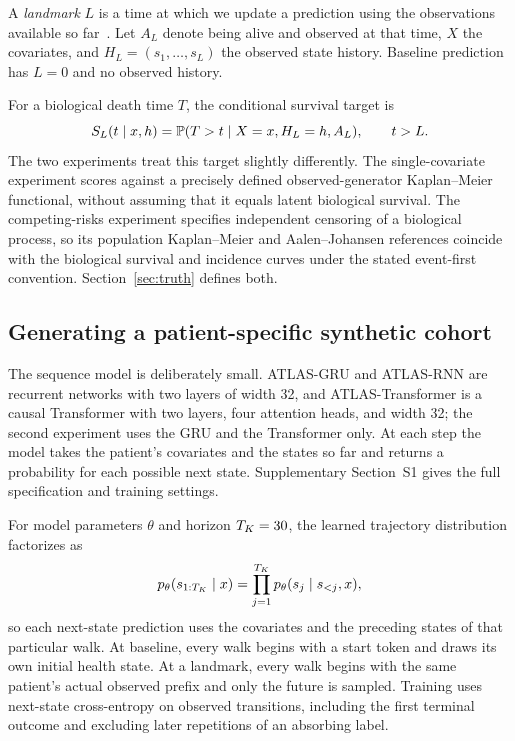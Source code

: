 A \emph{landmark} $L$ is a time at which we update a prediction using the observations available so far~\citep{vanhouwelingen2007}. Let $A_L$ denote being alive and observed at that time, $X$ the covariates, and $H_L=(s_1,\ldots,s_L)$ the observed state history. Baseline prediction has $L=0$ and no observed history.

For a biological death time $T$, the conditional survival target is
\begin{equation}\label{eq:landmark}
S_L(t\mid x,h)=\mathbb P(T>t\mid X=x,H_L=h,A_L),\qquad t>L.
\end{equation}
The two experiments treat this target slightly differently. The single-covariate experiment scores against a precisely defined observed-generator Kaplan--Meier functional, without assuming that it equals latent biological survival. The competing-risks experiment specifies independent censoring of a biological process, so its population Kaplan--Meier and Aalen--Johansen references coincide with the biological survival and incidence curves under the stated event-first convention. Section~\ref{sec:truth} defines both.

\subsection{Generating a patient-specific synthetic cohort}\label{sec:walks}
The sequence model is deliberately small. ATLAS-GRU and ATLAS-RNN are recurrent networks with two layers of width 32, and ATLAS-Transformer is a causal Transformer with two layers, four attention heads, and width 32; the second experiment uses the GRU and the Transformer only. At each step the model takes the patient's covariates and the states so far and returns a probability for each possible next state. Supplementary Section~S1 gives the full specification and training settings.

For model parameters $\theta$ and horizon $T_K=30$, the learned trajectory distribution factorizes as
\begin{equation}\label{eq:factor}
p_\theta(s_{1:T_K}\mid x)=\prod_{j=1}^{T_K}p_\theta(s_j\mid s_{<j},x),
\end{equation}
so each next-state prediction uses the covariates and the preceding states of that particular walk. At baseline, every walk begins with a start token and draws its own initial health state. At a landmark, every walk begins with the same patient's actual observed prefix and only the future is sampled. Training uses next-state cross-entropy on observed transitions, including the first terminal outcome and excluding later repetitions of an absorbing label.

